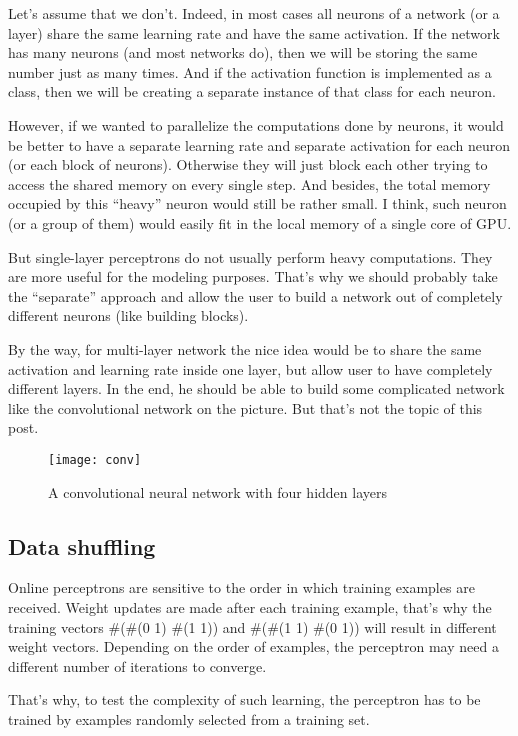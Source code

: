 Let’s assume that we don’t. Indeed, in most cases all neurons of a network (or a layer) share the same learning rate and have the same activation. If the network has many neurons (and most networks do), then we will be storing the same number just as many times. And if the activation function is implemented as a class, then we will be creating a separate instance of that class for each neuron.

However, if we wanted to parallelize the computations done by neurons, it would be better to have a separate learning rate and separate activation for each neuron (or each block of neurons). Otherwise they will just block each other trying to access the shared memory on every single step. And besides, the total memory occupied by this “heavy” neuron would still be rather small. I think, such neuron (or a group of them) would easily fit in the local memory of a single core of GPU.

But single-layer perceptrons do not usually perform heavy computations. They are more useful for the modeling purposes. That’s why we should probably take the “separate” approach and allow the user to build a network out of completely different neurons (like building blocks).

By the way, for multi-layer network the nice idea would be to share the same activation and learning rate inside one layer, but allow user to have completely different layers. In the end, he should be able to build some complicated network like the convolutional network on the picture. But that’s not the topic of this post.

\begin{figure}[H]
  \centering
  \texttt{[image: conv]}
  \caption{A convolutional neural network with four hidden layers}
  \label{fig:conv}
\end{figure}

\subsection{Data shuffling}
Online perceptrons are sensitive to the order in which training examples are received. Weight updates are made after each training example, that’s why the training vectors \#(\#(0 1) \#(1 1)) and \#(\#(1 1) \#(0 1)) will result in different weight vectors. Depending on the order of examples, the perceptron may need a different number of iterations to converge.

That’s why, to test the complexity of such learning, the perceptron has to be trained by examples randomly selected from a training set.
